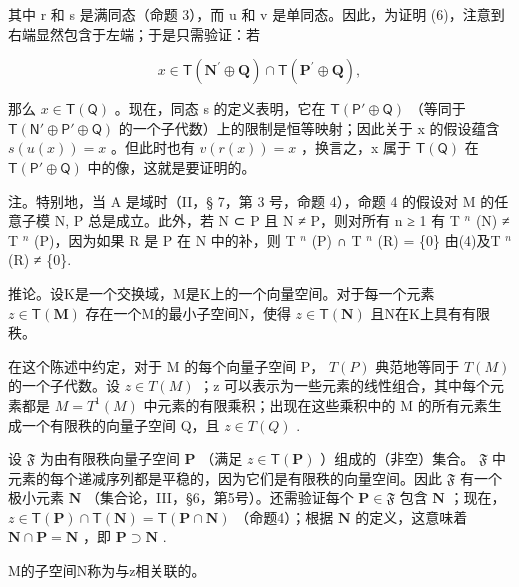 其中 r 和 s 是满同态（命题 3），而 u 和 v 是单同态。因此，为证明 (6)，注意到右端显然包含于左端；于是只需验证：若

\[
x \in \mathsf {T} (\mathbf {N} ^ {\prime} \oplus \mathbf {Q}) \cap \mathsf {T} (\mathbf {P} ^ {\prime} \oplus \mathbf {Q}),
\]

那么 \(x \in \mathsf{T}(\mathsf{Q})\) 。现在，同态 s 的定义表明，它在 \(\mathsf{T}(\mathsf{P}' \oplus \mathsf{Q})\) （等同于 \(\mathsf{T}(\mathsf{N}' \oplus \mathsf{P}' \oplus \mathsf{Q})\) 的一个子代数）上的限制是恒等映射；因此关于 x 的假设蕴含 \(s(u(x)) = x\) 。但此时也有 \(v(r(x)) = x\) ，换言之，x 属于 \(\mathsf{T}(\mathsf{Q})\) 在 \(\mathsf{T}(\mathsf{P}' \oplus \mathsf{Q})\) 中的像，这就是要证明的。

注。特别地，当 A 是域时（II，§ 7，第 3 号，命题 4），命题 4 的假设对 M 的任意子模 N, P 总是成立。此外，若 N ⊂ P 且 N ≠ P，则对所有 n ≥ 1 有 T \(^{n}\) (N) ≠ T \(^{n}\) (P)，因为如果 R 是 P 在 N 中的补，则 T \(^{n}\) (P) ∩ T \(^{n}\) (R) = \{0\} 由(4)及T \(^{n}\) (R) ≠ \{0\}.

推论。设K是一个交换域，M是K上的一个向量空间。对于每一个元素 \(z \in \mathsf{T}(\mathbf{M})\) 存在一个M的最小子空间N，使得 \(z \in \mathsf{T}(\mathbf{N})\) 且N在K上具有有限秩。

在这个陈述中约定，对于 M 的每个向量子空间 P， \(T(P)\) 典范地等同于 \(T(M)\) 的一个子代数。设 \(z \in T(M)\) ；z 可以表示为一些元素的线性组合，其中每个元素都是 \(M = T^{1}(M)\) 中元素的有限乘积；出现在这些乘积中的 M 的所有元素生成一个有限秩的向量子空间 Q，且 \(z \in T(Q)\) .

设 \(\mathfrak{F}\) 为由有限秩向量子空间 \(\mathbf{P}\) （满足 \(z\in \mathsf{T}(\mathbf{P})\) ）组成的（非空）集合。 \(\mathfrak{F}\) 中元素的每个递减序列都是平稳的，因为它们是有限秩的向量空间。因此 \(\mathfrak{F}\) 有一个极小元素 \(\mathbf{N}\) （集合论，III，§6，第5号）。还需验证每个 \(\mathbf{P}\in \mathfrak{F}\) 包含 \(\mathbf{N}\) ；现在， \(z\in \mathsf{T}(\mathbf{P})\cap \mathsf{T}(\mathbf{N}) = \mathsf{T}(\mathbf{P}\cap \mathbf{N})\) （命题4）；根据 \(\mathbf{N}\) 的定义，这意味着 \(\mathbf{N}\cap \mathbf{P} = \mathbf{N}\) ，即 \(\mathbf{P}\supset \mathbf{N}\) .

M的子空间N称为与z相关联的。

